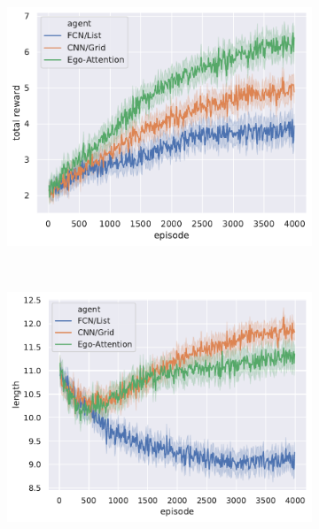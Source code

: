 \documentclass{article}
\begin{document}
\begin{figure}[htp]
	\centering
	\begin{subfigure}[t]{.6\linewidth}
		\centering\includegraphics[width=\linewidth]{img/total_reward}
	\end{subfigure}
\\
	\begin{subfigure}[t]{.49\linewidth}
		\centering\includegraphics[width=\linewidth]{img/length}
	\end{subfigure}
	\begin{subfigure}[t]{.49\linewidth}

\end{subfigure}
\end{figure}
\end{document}
